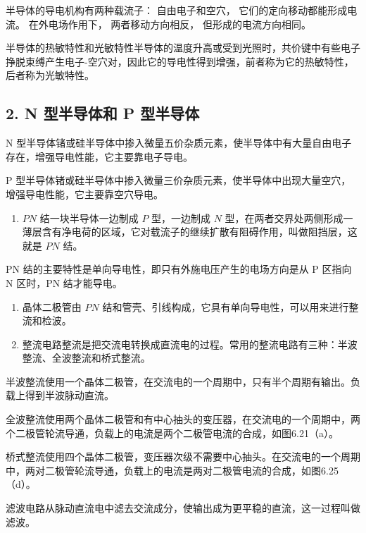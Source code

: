 半导体的导电机构有两种载流子： 自由电子和空穴，
它们的定向移动都能形成电流。 在外电场作用下， 两者移动方向相反，
但形成的电流方向相同。

半导体的热敏特性和光敏特性半导体的温度升高或受到光照时，共价键中有些电子挣脱束缚产生电子-空穴对，因此它的导电性得到增强，前者称为它的热敏特性，后者称为光敏特性。

\subsection{2. N 型半导体和 P
型半导体}\label{n-ux578bux534aux5bfcux4f53ux548c-p-ux578bux534aux5bfcux4f53}

N
型半导体锗或硅半导体中掺入微量五价杂质元素，使半导体中有大量自由电子存在，增强导电性能，它主要靠电子导电。

P
型半导体锗或硅半导体中掺入微量三价杂质元素，使半导体中出现大量空穴，增强导电性能，它主要靠空穴导电。

\begin{enumerate}
\def\labelenumi{\arabic{enumi}.}
\setcounter{enumi}{2}
\tightlist
\item
  \(PN\) 结一块半导体一边制成 \(P\) 型，一边制成 \(N\)
  型，在两者交界处两侧形成一薄层含有净电荷的区域，它对载流子的继续扩散有阻碍作用，叫做阻挡层，这就是
  \(PN\) 结。
\end{enumerate}

PN 结的主要特性是单向导电性，即只有外施电压产生的电场方向是从 P 区指向 N
区时，PN 结才能导电。

\begin{enumerate}
\def\labelenumi{\arabic{enumi}.}
\setcounter{enumi}{3}
\item
  晶体二极管由 \(PN\)
  结和管壳、引线构成，它具有单向导电性，可以用来进行整流和检波。
\item
  整流电路整流是把交流电转换成直流电的过程。常用的整流电路有三种：半波整流、全波整流和桥式整流。
\end{enumerate}

半波整流使用一个晶体二极管，在交流电的一个周期中，只有半个周期有输出。负载上得到半波脉动直流。

全波整流使用两个晶体二极管和有中心抽头的变压器，在交流电的一个周期中，两个二极管轮流导通，负载上的电流是两个二极管电流的合成，如图6.21（a）。

桥式整流使用四个晶体二极管，变压器次级不需要中心抽头。在交流电的一个周期中，两对二极管轮流导通，负载上的电流是两对二极管电流的合成，如图6.25（d）。

滤波电路从脉动直流电中滤去交流成分，使输出成为更平稳的直流，这一过程叫做滤波。

